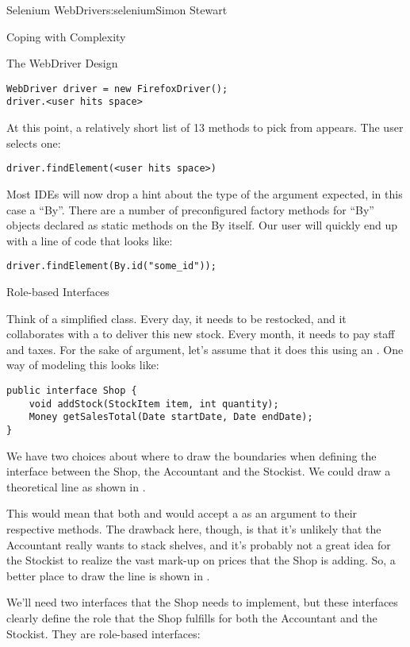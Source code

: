\begin{aosachapter}{Selenium WebDriver}{s:selenium}{Simon Stewart}
\begin{aosasect1}{Coping with Complexity}
\begin{aosasect2}{The WebDriver Design}
\begin{verbatim}
WebDriver driver = new FirefoxDriver();
driver.<user hits space>
\end{verbatim}

\noindent At this point, a relatively short list of 13 methods to pick from
appears. The user selects one:

\begin{verbatim}
driver.findElement(<user hits space>)
\end{verbatim}

\noindent Most IDEs will now drop a hint about the type of the argument
expected, in this case a ``By''. There are a number of preconfigured
factory methods for ``By'' objects declared as static methods on the
By itself. Our user will quickly end up with a line of code that looks
like:

\begin{verbatim}
driver.findElement(By.id("some_id"));
\end{verbatim}

\begin{aosabox}{Role-based Interfaces}

Think of a simplified  class. Every day, it needs to be
restocked, and it collaborates with a  to deliver this
new stock. Every month, it needs to pay staff and taxes. For the sake
of argument, let's assume that it does this using an
. One way of modeling this looks like:

\begin{verbatim}
public interface Shop {
    void addStock(StockItem item, int quantity);
    Money getSalesTotal(Date startDate, Date endDate);
}
\end{verbatim}

We have two choices about where to draw the boundaries when defining
the interface between the Shop, the Accountant and the Stockist. We
could draw a theoretical line as shown in .

This would mean that both  and  would
accept a  as an argument to their respective methods. The
drawback here, though, is that it's unlikely that the Accountant
really wants to stack shelves, and it's probably not a great idea for
the Stockist to realize the vast mark-up on prices that the Shop is
adding. So, a better place to draw the line is shown in
.

We'll need two interfaces that the Shop needs to implement, but these
interfaces clearly define the role that the Shop fulfills for both the
Accountant and the Stockist. They are role-based interfaces:


\end{aosabox}
\end{aosasect2}
\end{aosasect1}
\end{aosachapter}
